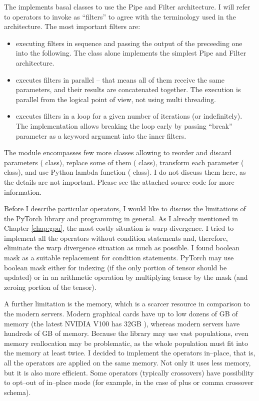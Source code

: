 The  implements basal classes to use the Pipe and Filter architecture. I will refer to operators to invoke as \enquote{filters} to agree with the terminology used in the architecture. The most important filters are:
\begin{itemize}
    \item {} executing filters in sequence and passing the output of the preceeding one into the following. The  class alone implements the simplest Pipe and Filter architecture.
    \item {} executes filters in parallel -- that means all of them receive the same parameters, and their results are concatenated together. The execution is parallel from the logical point of view, not using multi threading.
    \item {} executes filters in a loop for a given number of iterations (or indefinitely). The implementation allows breaking the loop early by passing \enquote{break} parameter as a keyword argument into the inner filters.
\end{itemize}
The module encompasses few more classes allowing to reorder and discard parameters ( class), replace some of them ( class), transform each parameter ( class), and use Python lambda function ( class). I do not discuss them here, as the details are not important. Please see the attached source code for more information.

Before I describe particular operators, I would like to discuss the limitations of the PyTorch library and \gpu programming in general. As I already mentioned in Chapter \ref{chap:gpu}, the most costly situation is warp divergence. I tried to implement all the operators without condition statements and, therefore, eliminate the warp divergence situation as much as possible. I found boolean mask as a suitable replacement for condition statements. PyTorch may use boolean mask either for indexing (if the only portion of tensor should be updated) or in an arithmetic operation by multiplying tensor by the mask (and zeroing portion of the tensor).

A further limitation is the \gpu memory, which is a scarcer resource in comparison to the modern servers. Modern graphical cards have up to low dozens of GB of memory (the latest NVIDIA V100 has 32GB \citep{nvidiav100spec}), whereas modern servers have hundreds of GB of memory. Because the library may use vast populations, even memory reallocation may be problematic, as the whole population must fit into the memory at least twice. I decided to implement the operators in--place, that is, all the operators are applied on the same memory. Not only it uses less memory, but it is also more efficient. Some operators (typically crossovers) have possibility to opt--out of in--place mode (for example, in the case of plus or comma crossover schema).

